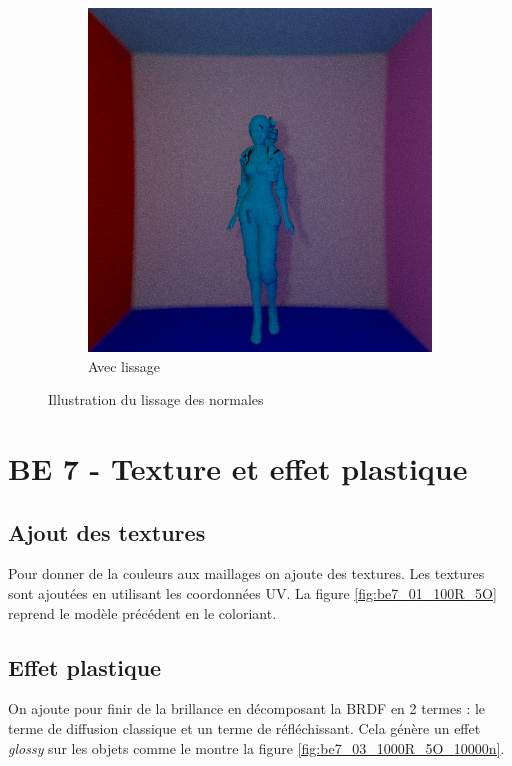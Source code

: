\documentclass[12pt,a4paper,twoside]{report}
\begin{document}
\begin{figure}[H]
\begin{subfigure}{.45\textwidth}
		\includegraphics[width=1.\linewidth]{be6_02_100R_5O}
		\caption{Avec lissage}
		\label{fig:be6_02_100R_5O}
	\end{subfigure}
	\caption{Illustration du lissage des normales}
\end{figure}

\newpage\section{BE 7 - Texture et effet plastique}

\subsection{Ajout des textures}

Pour donner de la couleurs aux maillages on ajoute des textures. Les textures sont ajoutées en utilisant les coordonnées UV. La figure \ref{fig:be7_01_100R_5O} reprend le modèle précédent en le coloriant.

\subsection{Effet plastique}

On ajoute pour finir de la brillance en décomposant la BRDF en 2 termes : le terme de diffusion classique et un terme de réfléchissant. Cela génère un effet \emph{glossy} sur les objets comme le montre la figure \ref{fig:be7_03_1000R_5O_10000n}.
\end{document}

